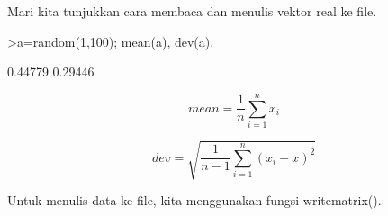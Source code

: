 \documentclass[a4paper,10pt]{article}
\begin{document}
\begin{eulernotebook}
\begin{eulercomment}
\begin{eulercomment}
\begin{eulercomment}
\begin{eulercomment}
\begin{eulercomment}
\begin{eulercomment}
\begin{eulercomment}
\begin{eulercomment}
\begin{eulercomment}
\begin{eulercomment}
\begin{eulercomment}
\begin{eulercomment}
\begin{eulercomment}
\begin{eulercomment}
\begin{eulercomment}
Mari kita tunjukkan cara membaca dan menulis vektor real ke file.
\end{eulercomment}
\begin{eulerprompt}
>a=random(1,100); mean(a), dev(a),
\end{eulerprompt}
\begin{euleroutput}
  0.44779
  0.29446
\end{euleroutput}
\begin{eulerformula}
\[
mean= \frac{1}{n} \sum_{i=1}^n x_i
\]
\end{eulerformula}
\begin{eulerformula}
\[
dev= \sqrt{\frac{1}{n-1}\sum_{i=1}^n(x_i-x)^2}
\]
\end{eulerformula}
\begin{eulercomment}
Untuk menulis data ke file, kita menggunakan fungsi writematrix().


\end{eulercomment}
\end{eulercomment}
\end{eulercomment}
\end{eulercomment}
\end{eulercomment}
\end{eulercomment}
\end{eulercomment}
\end{eulercomment}
\end{eulercomment}
\end{eulercomment}
\end{eulercomment}
\end{eulercomment}
\end{eulercomment}
\end{eulercomment}
\end{eulercomment}
\end{eulernotebook}
\end{document}

